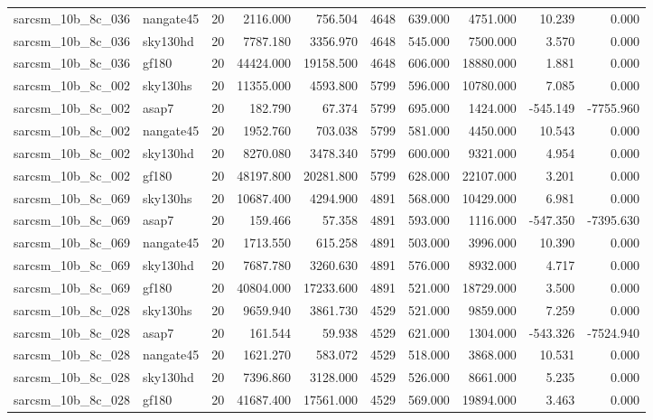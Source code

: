 \begin{tabular}{llrrrrrrrr}
sarcsm\_10b\_8c\_036 & nangate45 & 20 & 2116.000 & 756.504 & 4648 & 639.000 & 4751.000 & 10.239 & 0.000 \\
sarcsm\_10b\_8c\_036 & sky130hd & 20 & 7787.180 & 3356.970 & 4648 & 545.000 & 7500.000 & 3.570 & 0.000 \\
sarcsm\_10b\_8c\_036 & gf180 & 20 & 44424.000 & 19158.500 & 4648 & 606.000 & 18880.000 & 1.881 & 0.000 \\
sarcsm\_10b\_8c\_002 & sky130hs & 20 & 11355.000 & 4593.800 & 5799 & 596.000 & 10780.000 & 7.085 & 0.000 \\
sarcsm\_10b\_8c\_002 & asap7 & 20 & 182.790 & 67.374 & 5799 & 695.000 & 1424.000 & -545.149 & -7755.960 \\
sarcsm\_10b\_8c\_002 & nangate45 & 20 & 1952.760 & 703.038 & 5799 & 581.000 & 4450.000 & 10.543 & 0.000 \\
sarcsm\_10b\_8c\_002 & sky130hd & 20 & 8270.080 & 3478.340 & 5799 & 600.000 & 9321.000 & 4.954 & 0.000 \\
sarcsm\_10b\_8c\_002 & gf180 & 20 & 48197.800 & 20281.800 & 5799 & 628.000 & 22107.000 & 3.201 & 0.000 \\
sarcsm\_10b\_8c\_069 & sky130hs & 20 & 10687.400 & 4294.900 & 4891 & 568.000 & 10429.000 & 6.981 & 0.000 \\
sarcsm\_10b\_8c\_069 & asap7 & 20 & 159.466 & 57.358 & 4891 & 593.000 & 1116.000 & -547.350 & -7395.630 \\
sarcsm\_10b\_8c\_069 & nangate45 & 20 & 1713.550 & 615.258 & 4891 & 503.000 & 3996.000 & 10.390 & 0.000 \\
sarcsm\_10b\_8c\_069 & sky130hd & 20 & 7687.780 & 3260.630 & 4891 & 576.000 & 8932.000 & 4.717 & 0.000 \\
sarcsm\_10b\_8c\_069 & gf180 & 20 & 40804.000 & 17233.600 & 4891 & 521.000 & 18729.000 & 3.500 & 0.000 \\
sarcsm\_10b\_8c\_028 & sky130hs & 20 & 9659.940 & 3861.730 & 4529 & 521.000 & 9859.000 & 7.259 & 0.000 \\
sarcsm\_10b\_8c\_028 & asap7 & 20 & 161.544 & 59.938 & 4529 & 621.000 & 1304.000 & -543.326 & -7524.940 \\
sarcsm\_10b\_8c\_028 & nangate45 & 20 & 1621.270 & 583.072 & 4529 & 518.000 & 3868.000 & 10.531 & 0.000 \\
sarcsm\_10b\_8c\_028 & sky130hd & 20 & 7396.860 & 3128.000 & 4529 & 526.000 & 8661.000 & 5.235 & 0.000 \\
sarcsm\_10b\_8c\_028 & gf180 & 20 & 41687.400 & 17561.000 & 4529 & 569.000 & 19894.000 & 3.463 & 0.000 \\

\end{tabular}
